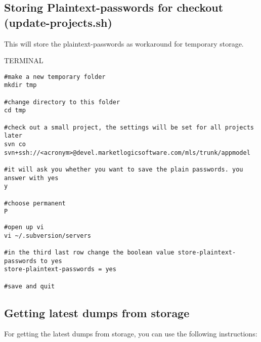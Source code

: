 \documentclass[10pt,a4paper]{article}
\begin{document}
\subsection{Storing Plaintext-passwords for checkout (update-projects.sh)}\label{sec:storing}

This will store the plaintext-passwords as workaround for temporary storage.

\begin{command}{TERMINAL}

\noindent
{}

\begin{lstlisting}
#make a new temporary folder
mkdir tmp

#change directory to this folder
cd tmp

#check out a small project, the settings will be set for all projects later
svn co svn+ssh://<acronym>@devel.marketlogicsoftware.com/mls/trunk/appmodel

#it will ask you whether you want to save the plain passwords. you answer with yes
y

#choose permanent
P
\end{lstlisting}

\noindent
{}

\begin{lstlisting}
#open up vi
vi ~/.subversion/servers

#in the third last row change the boolean value store-plaintext-passwords to yes
store-plaintext-passwords = yes

#save and quit
\end{lstlisting}

\noindent
{}

\end{command}

\subsection{Getting latest dumps from storage}\label{sec:autoDumps}
For getting the latest dumps from storage, you can use the following instructions:
\end{document}
